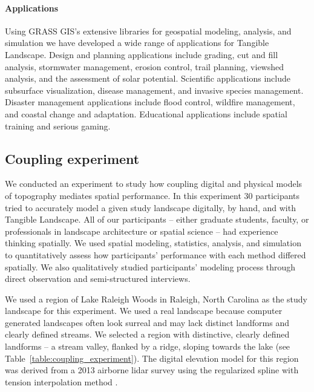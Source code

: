 \documentclass[prodmode,acmtochi]{acmsmall} %
\begin{document}
\paragraph{Applications}
Using GRASS GIS's extensive libraries for geospatial modeling, analysis, and simulation 
we have developed a wide range of applications for Tangible Landscape.
%
Design and planning applications include
grading, cut and fill analysis, stormwater management, erosion control, 
trail planning, viewshed analysis, and the assessment of solar potential. 
%
Scientific applications include
subsurface visualization, disease management, and invasive species management.
%
Disaster management applications include 
flood control, wildfire management, and coastal change and adaptation. 
%
Educational applications include
spatial training and serious gaming.



\subsection{Coupling experiment}
We conducted an experiment to study how 
coupling digital and physical models of topography 
mediates spatial performance. 
%
In this experiment 
30 participants tried to accurately model a given study landscape 
digitally, by hand, and with Tangible Landscape. 
%
All of our participants -- either graduate students, faculty, or professionals in landscape architecture or spatial science -- 
had experience thinking spatially. 
%
We used spatial modeling, statistics, analysis, and simulation to quantitatively assess how participants' performance with each method differed spatially. 
%
We also qualitatively studied participants' modeling process through direct observation and semi-structured interviews. 

We used a region of Lake Raleigh Woods in Raleigh, North Carolina 
as the study landscape for this experiment. 
%
We used a real landscape because computer generated landscapes 
often look surreal and may lack distinct landforms and clearly defined streams. 
%
We selected a region with distinctive, 
clearly defined landforms -- a stream valley, flanked by a ridge, sloping towards the lake
(see Table~\ref{table:coupling_experiment}). 
%
The digital elevation model for this region was derived from a 2013 airborne lidar survey 
using the regularized spline with tension interpolation method \cite{Mitasova2005}. 
\end{document}
